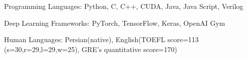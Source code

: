 

\begin{cventries}

\vspace{5mm}

  \begin{cvitems} %
    \item {Programming Languages: Python, C, C++, CUDA, Java, Java Script, Verilog}
    \item {Deep Learning Frameworks: PyTorch, TensorFlow, Keras, OpenAI Gym}
    \item {Human Languages: Persian(native), English(TOEFL score=113 (s=30,r=29,l=29,w=25), GRE's quantitative score=170)}
   \end{cvitems}
\end{cventries}
